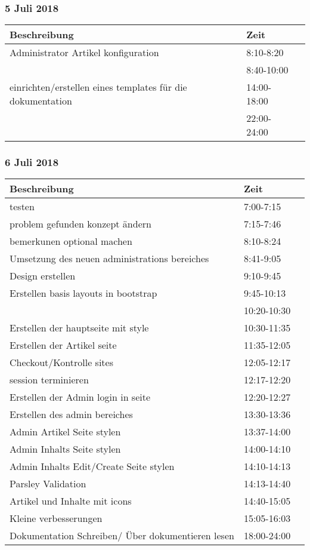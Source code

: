 \documentclass[a4paper, 11pt]{article}
\begin{document}
\subsubsection{5 Juli 2018}

\begin{tabular}{llr}
\toprule
Beschreibung & Zeit \\
\midrule
Administrator Artikel konfiguration & 8:10-8:20 \\
 & 8:40-10:00 \\
einrichten/erstellen eines templates für die dokumentation & 14:00-18:00 \\
 & 22:00-24:00 \\
\bottomrule
\end{tabular}

\subsubsection{6 Juli 2018}

\begin{tabular}{llr}
\toprule
Beschreibung & Zeit \\
\midrule
testen & 7:00-7:15 \\
problem gefunden konzept ändern & 7:15-7:46 \\
bemerkunen optional machen & 8:10-8:24 \\
Umsetzung des neuen administrations bereiches & 8:41-9:05 \\
Design erstellen & 9:10-9:45 \\
Erstellen basis layouts in bootstrap & 9:45-10:13 \\
 & 10:20-10:30 \\
Erstellen der hauptseite mit style & 10:30-11:35 \\
Erstellen der Artikel seite & 11:35-12:05 \\
Checkout/Kontrolle sites & 12:05-12:17 \\
session terminieren & 12:17-12:20 \\
Erstellen der Admin login in seite & 12:20-12:27 \\
Erstellen des admin bereiches & 13:30-13:36 \\
Admin Artikel Seite stylen & 13:37-14:00 \\
Admin Inhalts Seite stylen & 14:00-14:10 \\
Admin Inhalts Edit/Create Seite stylen & 14:10-14:13 \\
Parsley Validation & 14:13-14:40 \\
Artikel und Inhalte mit icons & 14:40-15:05 \\
Kleine verbesserungen & 15:05-16:03 \\
Dokumentation Schreiben/ Über dokumentieren lesen & 18:00-24:00 \\
\bottomrule
\end{tabular}
\end{document}
